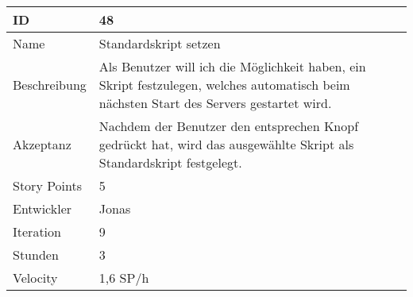\begin{table}[htbp]
    \begin{minipage}{\linewidth}
        \setlength{\tymax}{0.5\linewidth}
        \centering
        \small
        \begin{tabulary}{\textwidth}{|l|p{10cm}|} \hline
            ID   &48\\\hline
            Name  &Standardskript setzen\\\hline
            Beschreibung&Als Benutzer will ich die Möglichkeit haben, ein Skript festzulegen, welches automatisch beim nächsten Start des Servers gestartet wird.\\\hline
	    Akzeptanz &Nachdem der Benutzer den entsprechen Knopf gedrückt hat, wird das ausgewählte Skript als Standardskript festgelegt.\\\hline
            Story Points&5\\\hline
            Entwickler &Jonas\\\hline
            Iteration &9\\\hline
            Stunden  &3\\\hline
            Velocity &1,6 SP\slash h\\\hline
        \end{tabulary}
    \end{minipage}
\end{table}



